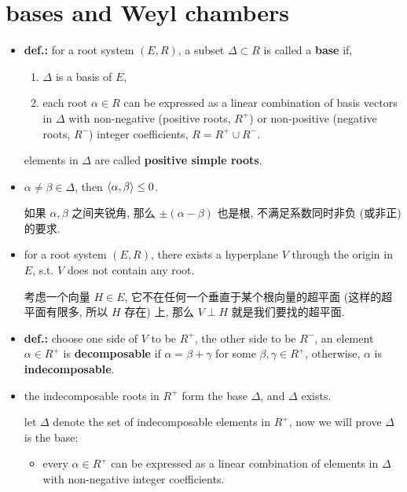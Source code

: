 \section{bases and Weyl chambers} \label{7.4}
\begin{itemize}
	\item \textbf{def.:} for a root system $(E, R)$, a subset $\Delta \subset R$ is called a \textbf{base} if,
	\begin{enumerate}
		\item $\Delta$ is a basis of $E$,
		
		\item each root $\alpha \in R$ can be expressed as a linear combination of basis vectors in $\Delta$ with non-negative (positive roots, $R^+$) or non-positive (negative roots, $R^-$) integer coefficients, $R = R^+ \cup R^-$.
	\end{enumerate}
	elements in $\Delta$ are called \textbf{positive simple roots}.
	
	\item $\alpha \neq \beta \in \Delta$, then $\braket{\alpha, \beta} \leq 0$.
	
	\begin{tcolorbox}[title=proof:]
		如果 $\alpha, \beta$ 之间夹锐角, 那么 $\pm (\alpha - \beta)$ 也是根, 不满足系数同时非负 (或非正) 的要求.
	\end{tcolorbox}
	
	\item for a root system $(E, R)$, there exists a hyperplane $V$ through the origin in $E$, s.t. $V$ does not contain any root.
	
	\begin{tcolorbox}[title=proof:]
		考虑一个向量 $H \in E$, 它不在任何一个垂直于某个根向量的超平面 (这样的超平面有限多, 所以 $H$ 存在) 上, 那么 $V \perp H$ 就是我们要找的超平面.
	\end{tcolorbox}
	
	\item \textbf{def.:} choose one side of $V$ to be $R^+$, the other side to be $R^-$, an element $\alpha \in R^+$ is \textbf{decomposable} if $\alpha = \beta + \gamma$ for some $\beta, \gamma \in R^+$, otherwise, $\alpha$ is \textbf{indecomposable}.
	
	\item the indecomposable roots in $R^+$ form the base $\Delta$, and $\Delta$ exists.
	
	\begin{tcolorbox}[title=proof:]
		let $\Delta$ denote the set of indecomposable elements in $R^+$, now we will prove $\Delta$ is the base:
		\begin{itemize}
			\item every $\alpha \in R^+$ can be expressed as a linear combination of elements in $\Delta$ with non-negative integer coefficients.
			

\end{itemize}
\end{tcolorbox}
\end{itemize}
